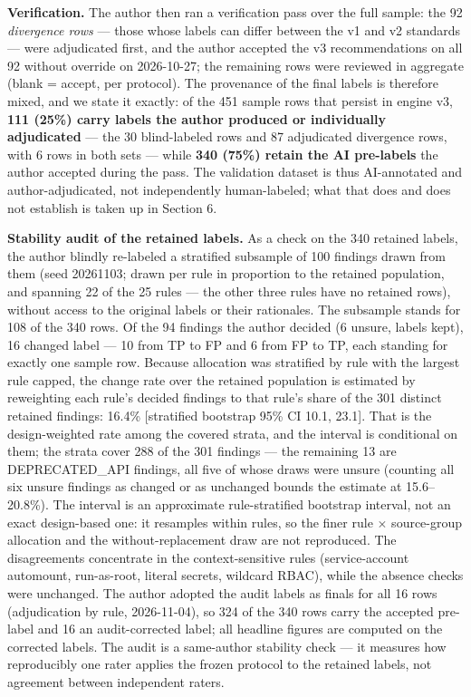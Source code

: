 \documentclass[pdflatex,sn-basic]{sn-jnl}
\begin{document}
\textbf{Verification.} The author then ran a verification pass over the
full sample: the 92 \emph{divergence rows} --- those whose labels can
differ between the v1 and v2 standards --- were adjudicated first, and
the author accepted the v3 recommendations on all 92 without override on
2026-10-27; the remaining rows were reviewed in aggregate (blank =
accept, per protocol). The provenance of the final labels is therefore
mixed, and we state it exactly: of the 451 sample rows that persist in
engine v3, \textbf{111 (25\%) carry labels the author produced or
individually adjudicated} --- the 30 blind-labeled rows and 87
adjudicated divergence rows, with 6 rows in both sets --- while
\textbf{340 (75\%) retain the AI pre-labels} the author accepted during
the pass. The validation dataset is thus AI-annotated and
author-adjudicated, not independently human-labeled; what that does and
does not establish is taken up in Section 6.

\textbf{Stability audit of the retained labels.} As a check on the 340
retained labels, the author blindly re-labeled a stratified subsample of
100 findings drawn from them (seed 20261103; drawn per rule in proportion
to the retained population, and spanning 22 of the 25 rules --- the other
three rules have no retained rows), without access to the original labels
or their rationales. The subsample stands for 108 of the 340 rows. Of the
94 findings the author decided (6 unsure, labels kept), 16 changed label
--- 10 from TP to FP and 6 from FP to TP, each standing for exactly one
sample row. Because allocation was stratified by rule with the largest
rule capped, the change rate over the retained population is estimated by
reweighting each rule's decided findings to that rule's share of the 301
distinct retained findings: 16.4\% [stratified bootstrap 95\% CI 10.1,
23.1]. That is the design-weighted rate among the covered strata, and
the interval is conditional on them; the strata cover 288 of the 301
findings --- the remaining 13 are
DEPRECATED\_API findings, all five of whose draws were unsure (counting all
six unsure findings as changed or as unchanged bounds the estimate at
15.6--20.8\%). The interval is an approximate rule-stratified bootstrap
interval, not an exact design-based one: it resamples within rules, so
the finer rule $\times$ source-group allocation and the
without-replacement draw are not reproduced. The disagreements concentrate in the context-sensitive
rules (service-account automount, run-as-root, literal secrets, wildcard
RBAC), while the absence checks were unchanged.
The author adopted the audit labels as finals for all 16 rows
(adjudication by rule, 2026-11-04), so 324 of the 340 rows carry the
accepted pre-label and 16 an audit-corrected label; all headline figures
are computed on the corrected labels. The audit is a same-author
stability check --- it measures how reproducibly one rater applies the
frozen protocol to the retained labels, not agreement between independent
raters.
\end{document}
